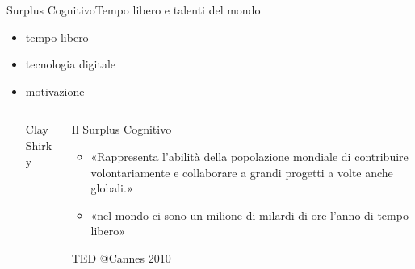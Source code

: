 \documentclass[italian,compress,red]{beamer}
\begin{document}
\begin{frame}{Surplus Cognitivo}{Tempo libero e talenti del mondo}
 \begin{itemize}
  \item tempo libero
  \item tecnologia digitale
  \item motivazione
  
  \begin{columns}[T]
  \begin{column}{.3\textwidth}
    \begin{block}{Clay Shirky}
      \begin{center}
      \end{center}
     \end{block}

  \end{column} 
  \begin{column}{.7\textwidth}
    \begin{exampleblock}{Il Surplus Cognitivo}
    \begin{itemize}
     \item «Rappresenta l'abilità della popolazione mondiale di contribuire volontariamente 
e collaborare a grandi progetti a volte anche globali.»
     \item  «nel mondo ci sono un milione di milardi di ore l'anno di tempo libero»
    \end{itemize}

   
      \vfill
      \begin{tiny} TED @Cannes 2010 \end{tiny}
      
    \end{exampleblock}   
  \end{column}
  \end{columns} 

 \end{itemize}

\end{frame}
\end{document}
